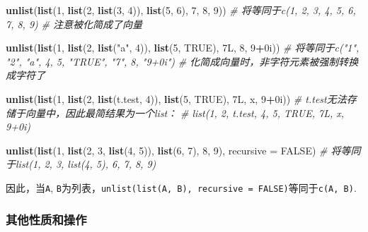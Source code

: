 \documentclass[]{book}
\newenvironment{Shaded}{\begin{snugshade}}{\end{snugshade}}
\newcommand{\CommentTok}[1]{\textcolor[rgb]{0.56,0.35,0.01}{\textit{#1}}}
\newcommand{\DataTypeTok}[1]{\textcolor[rgb]{0.13,0.29,0.53}{#1}}
\newcommand{\DecValTok}[1]{\textcolor[rgb]{0.00,0.00,0.81}{#1}}
\newcommand{\KeywordTok}[1]{\textcolor[rgb]{0.13,0.29,0.53}{\textbf{#1}}}
\newcommand{\NormalTok}[1]{#1}
\newcommand{\OperatorTok}[1]{\textcolor[rgb]{0.81,0.36,0.00}{\textbf{#1}}}
\newcommand{\OtherTok}[1]{\textcolor[rgb]{0.56,0.35,0.01}{#1}}
\newcommand{\StringTok}[1]{\textcolor[rgb]{0.31,0.60,0.02}{#1}}
\begin{document}
\begin{Shaded}
\begin{Highlighting}[]
\KeywordTok{unlist}\NormalTok{(}\KeywordTok{list}\NormalTok{(}\DecValTok{1}\NormalTok{, }\KeywordTok{list}\NormalTok{(}\DecValTok{2}\NormalTok{, }\KeywordTok{list}\NormalTok{(}\DecValTok{3}\NormalTok{, }\DecValTok{4}\NormalTok{)), }\KeywordTok{list}\NormalTok{(}\DecValTok{5}\NormalTok{, }\DecValTok{6}\NormalTok{), }\DecValTok{7}\NormalTok{, }\DecValTok{8}\NormalTok{, }\DecValTok{9}\NormalTok{))}
\CommentTok{# 将等同于c(1, 2, 3, 4, 5, 6, 7, 8, 9) }
\CommentTok{# 注意被化简成了向量}

\KeywordTok{unlist}\NormalTok{(}\KeywordTok{list}\NormalTok{(}\DecValTok{1}\NormalTok{, }\KeywordTok{list}\NormalTok{(}\DecValTok{2}\NormalTok{, }\KeywordTok{list}\NormalTok{(}\StringTok{"a"}\NormalTok{, }\DecValTok{4}\NormalTok{)), }\KeywordTok{list}\NormalTok{(}\DecValTok{5}\NormalTok{, }\OtherTok{TRUE}\NormalTok{), 7L, }\DecValTok{8}\NormalTok{, }\DecValTok{9}\OperatorTok{+}\NormalTok{0i))}
\CommentTok{# 将等同于c("1", "2", "a", 4, 5, "TRUE", "7", 8, "9+0i")}
\CommentTok{# 化简成向量时，非字符元素被强制转换成字符了}

\KeywordTok{unlist}\NormalTok{(}\KeywordTok{list}\NormalTok{(}\DecValTok{1}\NormalTok{, }\KeywordTok{list}\NormalTok{(}\DecValTok{2}\NormalTok{, }\KeywordTok{list}\NormalTok{(t.test, }\DecValTok{4}\NormalTok{)), }\KeywordTok{list}\NormalTok{(}\DecValTok{5}\NormalTok{, }\OtherTok{TRUE}\NormalTok{), 7L, x, }\DecValTok{9}\OperatorTok{+}\NormalTok{0i))}
\CommentTok{# t.test无法存储于向量中，因此最简结果为一个list：}
\CommentTok{# list(1, 2, t.test, 4, 5, TRUE, 7L, x, 9+0i)}


\KeywordTok{unlist}\NormalTok{(}\KeywordTok{list}\NormalTok{(}\DecValTok{1}\NormalTok{, }\KeywordTok{list}\NormalTok{(}\DecValTok{2}\NormalTok{, }\DecValTok{3}\NormalTok{, }\KeywordTok{list}\NormalTok{(}\DecValTok{4}\NormalTok{, }\DecValTok{5}\NormalTok{)), }\KeywordTok{list}\NormalTok{(}\DecValTok{6}\NormalTok{, }\DecValTok{7}\NormalTok{), }\DecValTok{8}\NormalTok{, }\DecValTok{9}\NormalTok{), }\DataTypeTok{recursive =} \OtherTok{FALSE}\NormalTok{)}
\CommentTok{# 将等同于list(1, 2, 3, list(4, 5), 6, 7, 8, 9)}
\end{Highlighting}
\end{Shaded}

因此，当\texttt{A}, \texttt{B}为列表，\texttt{unlist(list(A,\ B),\ recursive\ =\ FALSE)}等同于\texttt{c(A,\ B)}.

\hypertarget{list-other-properties-operations}{%
\subsubsection{其他性质和操作}\label{list-other-properties-operations}}
\end{document}
